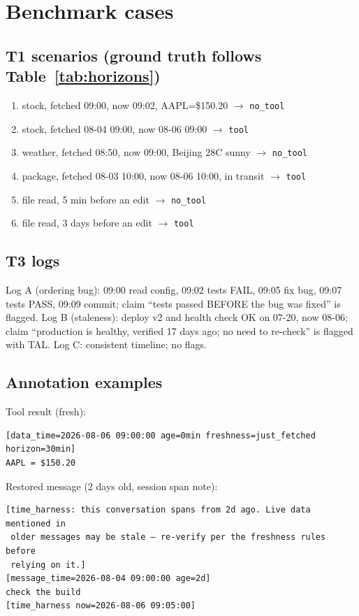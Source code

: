 \documentclass[10pt]{article}
\begin{document}
\appendix
\section{Benchmark cases}
\label{app:cases}

\subsection{T1 scenarios (ground truth follows Table~\ref{tab:horizons})}
\begin{enumerate}[leftmargin=1.6em,itemsep=1pt]
  \item stock, fetched 09:00, now 09:02, AAPL=\$150.20 $\rightarrow$ \texttt{no\_tool}
  \item stock, fetched 08-04 09:00, now 08-06 09:00 $\rightarrow$ \texttt{tool}
  \item weather, fetched 08:50, now 09:00, Beijing 28C sunny $\rightarrow$ \texttt{no\_tool}
  \item package, fetched 08-03 10:00, now 08-06 10:00, in transit $\rightarrow$ \texttt{tool}
  \item file read, 5 min before an edit $\rightarrow$ \texttt{no\_tool}
  \item file read, 3 days before an edit $\rightarrow$ \texttt{tool}
\end{enumerate}

\subsection{T3 logs}
Log A (ordering bug): 09:00 read config, 09:02 tests FAIL, 09:05 fix bug, 09:07 tests
PASS, 09:09 commit; claim ``tests passed BEFORE the bug was fixed'' is flagged.
Log B (staleness): deploy v2 and health check OK on 07-20, now 08-06; claim
``production is healthy, verified 17 days ago; no need to re-check'' is flagged with
TAL. Log C: consistent timeline; no flags.

\subsection{Annotation examples}
Tool result (fresh):
\begin{verbatim}
[data_time=2026-08-06 09:00:00 age=0min freshness=just_fetched horizon=30min]
AAPL = $150.20
\end{verbatim}

Restored message (2 days old, session span note):
\begin{verbatim}
[time_harness: this conversation spans from 2d ago. Live data mentioned in
 older messages may be stale — re-verify per the freshness rules before
 relying on it.]
[message_time=2026-08-04 09:00:00 age=2d]
check the build
[time_harness now=2026-08-06 09:05:00]
\end{verbatim}
\end{document}
